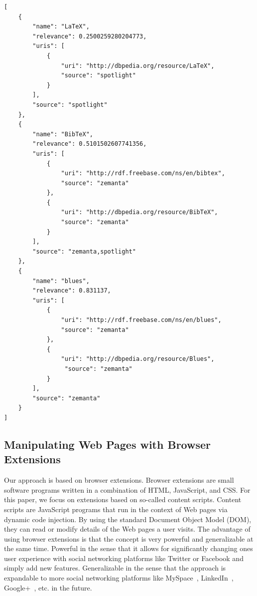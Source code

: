 \documentclass{iosart2c}
\begin{document}
\begin{lstlisting}[caption={Named entity disambiguation wrapper API output in JSON form for the micropost \textit{``Tom has the LaTeX, BibTeX, LaTeX, LaTeX blues...''}.},label={lst:nlpjson}]
[
    {
        "name": "LaTeX",
        "relevance": 0.2500259280204773,
        "uris": [
            {
                "uri": "http://dbpedia.org/resource/LaTeX",
                "source": "spotlight"
            }
        ],
        "source": "spotlight"
    },
    {
        "name": "BibTeX",
        "relevance": 0.5101502607741356,
        "uris": [
            {
                "uri": "http://rdf.freebase.com/ns/en/bibtex",
                "source": "zemanta"
            },
            {
                "uri": "http://dbpedia.org/resource/BibTeX",
                "source": "zemanta"
            }
        ],
        "source": "zemanta,spotlight"
    },
    {
        "name": "blues",
        "relevance": 0.831137,
        "uris": [
            {
                "uri": "http://rdf.freebase.com/ns/en/blues",
                "source": "zemanta"
            },
            {
                "uri": "http://dbpedia.org/resource/Blues",
                 "source": "zemanta"
            }
        ],
        "source": "zemanta"
    }    
]
\end{lstlisting}

\subsection{Manipulating Web Pages with Browser Extensions}
Our approach is based on browser extensions.
Browser extensions are small software programs written in a combination of HTML, JavaScript, and CSS.
For this paper, we focus on extensions based on so-called content scripts.
Content scripts are JavaScript programs that run in the context of Web pages via dynamic code injection.
By using the standard Document Object Model (DOM), they can read or modify details of the Web pages a user visits.
The advantage of using browser extensions is that the concept is very powerful and generalizable at the same time.
Powerful in the sense that it allows for significantly changing ones user experience with social networking platforms like Twitter or Facebook and simply add new features.
Generalizable in the sense that the approach is expandable to more social networking platforms like MySpace~\cite{MySpace}, LinkedIn~\cite{LinkedIn}, Google+~\cite{GooglePlus}, etc. in the future.
\end{document}
